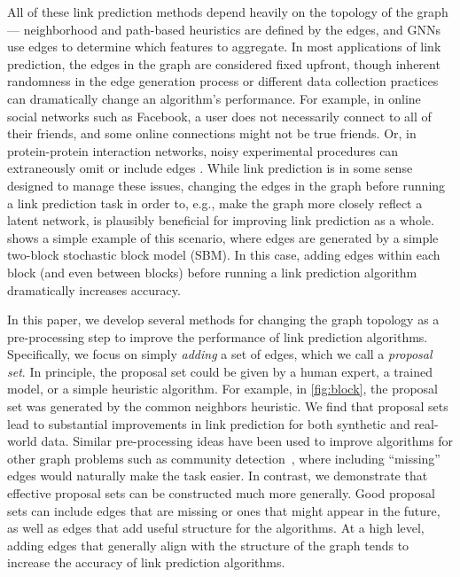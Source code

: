 \documentclass{article}
\begin{document}
All of these link prediction methods depend heavily on the topology of the graph --- neighborhood and path-based heuristics are defined by the edges, and GNNs use edges to determine which features to aggregate.
In most applications of link prediction, the edges in the graph are considered fixed upfront, though
inherent randomness in the edge generation process or different data collection practices can dramatically change an algorithm's performance.
For example, in online social networks such as Facebook, a user does not necessarily connect to all of their friends,
and some online connections might not be true friends.
Or, in protein-protein interaction networks, noisy experimental procedures can extraneously omit or include edges
 \cite{Mering2002ComparativeAO}.
While link prediction is in some sense designed to manage these issues, 
changing the edges in the graph before running a link prediction task in order to, e.g., make the graph more closely reflect a latent network,
is plausibly beneficial for improving link prediction as a whole.
 shows a simple example of this scenario, where edges are generated by a simple two-block stochastic block model (SBM).
In this case, adding edges within each block (and even between blocks) before running a link prediction algorithm
dramatically increases accuracy.

In this paper, we develop several methods for changing the graph topology as a pre-processing step to improve the performance of link prediction algorithms.
Specifically, we focus on simply \emph{adding} a set of edges, which we call a \emph{proposal set}.
In principle, the proposal set could be given by a human expert, a trained model, or a simple heuristic algorithm.
For example, in \cref{fig:block}, the proposal set was generated by the common neighbors heuristic.
We find that proposal sets lead to substantial improvements in link prediction for both synthetic and real-world data.
Similar pre-processing ideas have been used to improve algorithms for other graph problems such as community detection~\cite{Bahulkar2018CommunityDW},
where including ``missing'' edges would naturally make the task easier.
In contrast, we demonstrate that effective proposal sets can be constructed much more generally.
Good proposal sets can include edges that are missing or ones that might appear in the future, 
as well as edges that add useful structure for the algorithms.
At a high level, adding edges that generally align with the structure of the graph tends
to increase the accuracy of link prediction algorithms.
\end{document}
